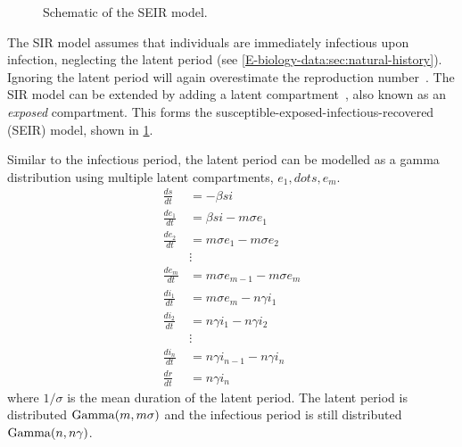 \documentclass[thesis.tex]{subfiles}
\begin{document}
\begin{figure}[h]
  \caption[The SEIR model]{Schematic of the SEIR model.}
  \label{SEIR:fig:SEIR}
\end{figure}

The SIR model assumes that individuals are immediately infectious upon infection, neglecting the latent period (see \cref{E-biology-data:sec:natural-history}).
Ignoring the latent period will again overestimate the reproduction number~\autocite{wearingAppropriate}.
The SIR model can be extended by adding a latent compartment~\autocite[41]{keelingModeling}, also known as an \emph{exposed} compartment.
This forms the susceptible-exposed-infectious-recovered (SEIR) model, shown in \cref{SEIR:fig:SEIR}.

Similar to the infectious period, the latent period can be modelled as a gamma distribution using multiple latent compartments, $e_1, dots, e_m$.
\begin{align}
\frac{ds}{dt} &= -\beta si \\
\frac{de_1}{dt} &= \beta si - m\sigma e_1 \\
\frac{de_2}{dt} &= m\sigma e_1 - m \sigma e_2 \\
&\vdots \nonumber \\
\frac{de_m}{dt} &= m\sigma e_{m-1} - m \sigma e_m \\
\frac{di_1}{dt} &= m\sigma e_m - n\gamma i_1 \\
\frac{di_2}{dt} &= n\gamma i_1 - n \gamma i_2 \\
&\vdots \nonumber \\
\frac{di_n}{dt} &= n\gamma i_{n-1} - n \gamma i_n \\
\frac{dr}{dt} &= n\gamma i_n
\end{align}
where $1/\sigma$ is the mean duration of the latent period.
The latent period is distributed $\operatorname{Gamma}(m, m\sigma)$ and the infectious period is still distributed $\operatorname{Gamma}(n, n\gamma)$.
\end{document}
